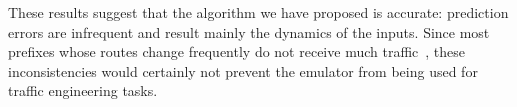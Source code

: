 These results suggest that the algorithm we have proposed is accurate:
prediction errors are infrequent and result mainly 
the dynamics of the inputs.  Since most prefixes whose routes change
frequently do not receive much traffic~\cite{Rexford:stability2002}, these
inconsistencies would certainly not prevent the emulator from
being used for traffic engineering tasks.










